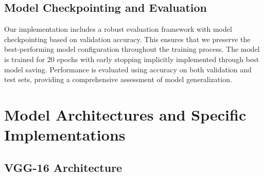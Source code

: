 \documentclass[a4paper,12pt]{report}
\begin{document}
\subsection{Model Checkpointing and Evaluation}

Our implementation includes a robust evaluation framework with model checkpointing based on validation accuracy. This ensures that we preserve the best-performing model configuration throughout the training process. The model is trained for 20 epochs with early stopping implicitly implemented through best model saving. Performance is evaluated using accuracy on both validation and test sets, providing a comprehensive assessment of model generalization.

\section{Model Architectures and Specific Implementations}

\subsection{VGG-16 Architecture}
\end{document}
